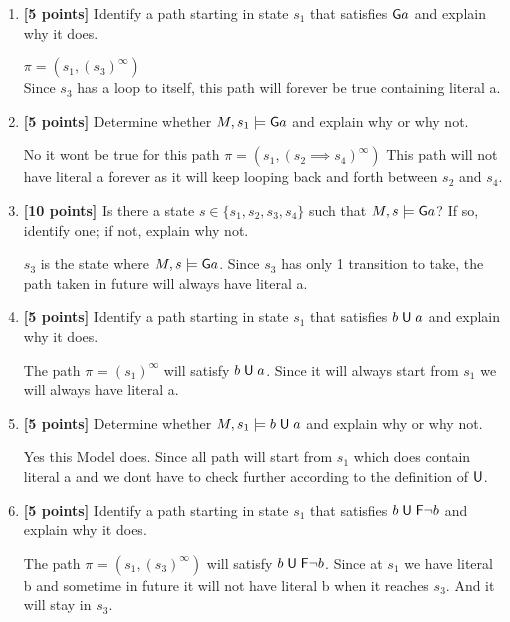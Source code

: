\documentclass{article}
\begin{document}
\begin{enumerate}
\item \textbf{[5 points]} Identify a path starting in state $s_1$
  that satisfies $\mathord{\mathsf{G}} a$ and explain why it does.
    \begin{answer}
     $\pi = (s_1, (s_3)^\infty)$ \\
     Since $s_3$ has a loop to itself, this path will forever be true containing literal a.
    \end{answer}
\item \textbf{[5 points]} Determine whether
  $M, s_1 \models \mathord{\mathsf{G}} a$ and explain why or why not.
 \begin{answer}
  No it wont be true for this path $\pi =  (s_1, (s_2 \implies s_4)^\infty)$ This path will not have literal a forever as it will keep looping back and forth between $s_2$ and $s_4$.
 \end{answer}
\item \textbf{[10 points]} Is there a state
  $s \in \{ s_1, s_2, s_3, s_4 \}$ such that
  $M, s \models \mathord{\mathsf{G}} a$?  If so, identify one; if not, explain why
  not.
 \begin{answer}
  $s_3$ is the state where $M, s \models \mathord{\mathsf{G}} a$. Since $s_3$ has only 1 transition to take, the path taken in future will always have literal a.
 \end{answer}
\item \textbf{[5 points]} Identify a path starting in state $s_1$
  that satisfies $b \mathrel{\mathsf{U}} a$ and explain why it does.
 \begin{answer}
  The path $\pi =  (s_1)^\infty $ will satisfy  $b \mathrel{\mathsf{U}} a$. Since it will always start from $s_1$ we will always have literal a.
 \end{answer}
\item \textbf{[5 points]} Determine whether $M, s_1 \models
  b \mathrel{\mathsf{U}} a$ and explain why or why not.
 \begin{answer}
  Yes this Model does. Since all path will start from $s_1$ which does contain literal a and we dont have to check further according to the definition of $\mathrel{\mathsf{U}}$.
 \end{answer}
\item \textbf{[5 points]} Identify a path starting in state $s_1$
  that satisfies $b \mathrel{\mathsf{U}} \mathord{\mathsf{F}} \neg b$ and explain why it does.
 \begin{answer}
  The path $\pi =  (s_1 , (s_3)^\infty)$ will satisfy  $b \mathrel{\mathsf{U}} \mathord{\mathsf{F}} \neg b$. Since at $s_1$ we have literal b and sometime in future it will not have literal b when it reaches $s_3$. And it will stay in $s_3$.

\end{answer}
\end{enumerate}
\end{document}

